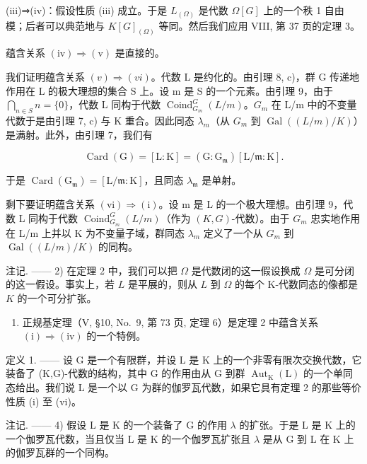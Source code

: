 (iii)⇒(iv)：假设性质 (iii) 成立。于是 \(L_{(\Omega)}\) 是代数 \(\Omega[G]\) 上的一个秩 1 自由模；后者可以典范地与 \(K[G]_{(\Omega)}\) 等同。然后我们应用 VIII, 第 37 页的定理 3。

蕴含关系 \((\mathrm{iv})\Rightarrow (\mathrm{v})\) 是直接的。

我们证明蕴含关系 \((v)\Rightarrow(vi)\)。代数 L 是约化的。由引理 8, c)，群 G 传递地作用在 L 的极大理想的集合 S 上。设 m 是 S 的一个元素。由引理 9，由于 \(\bigcap_{n\in S}n=\{0\}\)，代数 L 同构于代数 \(\operatorname{Coind}_{G_{m}}^{G}(L/m)\)。\(G_{m}\) 在 L/m 中的不变量代数于是由引理 7, c) 与 K 重合。因此同态 \(\lambda_{m}\)（从 \(G_{m}\) 到 \(\operatorname{Gal}((L/m)/K)\)）是满射。此外，由引理 7，我们有

\[
\operatorname{Card} (\mathrm{G}) = [ \mathrm{L}: \mathrm{K} ] = (\mathrm{G}: \mathrm{G} _ {\mathfrak {m}}) [ \mathrm{L} / \mathfrak {m}: \mathrm{K} ].
\]

于是 \(\operatorname{Card}(\mathrm{G}_{\mathfrak{m}}) = [\mathrm{L} / \mathfrak{m}:\mathrm{K}]\)，且同态 \(\lambda_{\mathfrak{m}}\) 是单射。

剩下要证明蕴含关系 \((\mathrm{vi})\Rightarrow(\mathrm{i})\)。设 m 是 L 的一个极大理想。由引理 9，代数 L 同构于代数 \(\operatorname{Coind}_{G_{m}}^{G}(L/m)\)（作为 \((K,G)\)-代数）。由于 \(G_{m}\) 忠实地作用在 L/m 上并以 K 为不变量子域，群同态 \(\lambda_{m}\) 定义了一个从 \(G_{m}\) 到 \(\operatorname{Gal}((L/m)/K)\) 的同构。

注记. —— 2) 在定理 2 中，我们可以把 \(\Omega\) 是代数闭的这一假设换成 \(\Omega\) 是可分闭的这一假设。事实上，若 \(L\) 是平展的，则从 \(L\) 到 \(\Omega\) 的每个 K-代数同态的像都是 \(K\) 的一个可分扩张。

\begin{enumerate}
\def\labelenumi{\arabic{enumi})}
\setcounter{enumi}{2}
\tightlist
\item
  正规基定理（V, §10, No.~9, 第 73 页, 定理 6）是定理 2 中蕴含关系 \((\mathrm{i})\Rightarrow (\mathrm{iv})\) 的一个特例。
\end{enumerate}

定义 1. —— 设 G 是一个有限群，并设 L 是 K 上的一个非零有限次交换代数，它装备了 (K,G)-代数的结构，其中 G 的作用由从 G 到群 \(\operatorname{Aut}_{\mathrm{K}}(\mathrm{L})\) 的一个单同态给出。我们说 L 是一个以 G 为群的伽罗瓦代数，如果它具有定理 2 的那些等价性质 (i) 至 (vi)。

注记. —— 4) 假设 L 是 K 的一个装备了 G 的作用 \(\lambda\) 的扩张。于是 L 是 K 上的一个伽罗瓦代数，当且仅当 L 是 K 的一个伽罗瓦扩张且 \(\lambda\) 是从 G 到 L 在 K 上的伽罗瓦群的一个同构。

